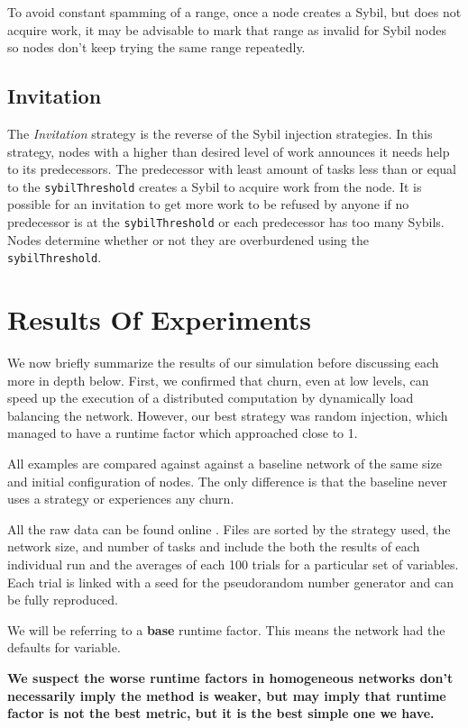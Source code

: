 To avoid constant spamming of a range, once a node creates a Sybil, but does not acquire work, it may be advisable to mark that range as invalid for Sybil nodes so nodes don't keep trying the same range repeatedly. 


\subsection{Invitation}
The \textit{Invitation} strategy is the reverse of the Sybil injection strategies.
In  this strategy, nodes with a higher than desired level of work announces it needs help to its predecessors.
The predecessor with least amount of tasks less than or equal to the \texttt{sybilThreshold} creates a Sybil to acquire work from the node.
It is possible for an invitation to get more work to be refused by anyone if no  predecessor is at the \texttt{sybilThreshold} or each predecessor has too many Sybils.
Nodes determine whether or not they are overburdened using the \texttt{sybilThreshold}.



\section{Results Of Experiments}
\label{sec:autonomous-results}

We now briefly summarize the results of our simulation before discussing each more in depth below.
First, we confirmed that churn, even at low levels, can speed up the execution of a distributed computation by dynamically load balancing the network.
However, our best strategy was random injection, which managed to have a runtime factor which approached close to 1.

All examples are compared against against a baseline network of the same size and initial configuration of nodes. 
The only difference is that the baseline never uses a strategy or experiences any churn.

All the raw data can be found online \cite{simulation-data}.
Files are sorted by the strategy used, the network size,  and number of tasks and include the both the results of each individual run and the averages of each 100 trials for a particular set of variables.
Each trial is linked with a seed for the pseudorandom number generator and can be fully reproduced.

We will be referring to a \textbf{base} runtime factor.
This means the network had the defaults for variable.

\textbf{We suspect the worse runtime factors in homogeneous networks don't necessarily imply the method is weaker, but may imply that runtime factor is not the best metric, but it is the best simple one we have.}


